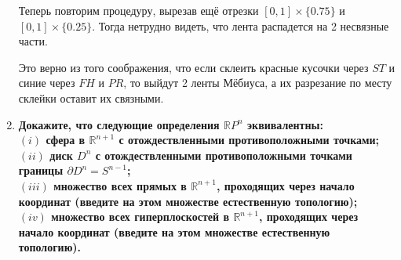 \documentclass{article}
\begin{document}
\begin{enumerate}
        Теперь повторим процедуру, вырезав ещё отрезки $[0,1]\times\{0.75\}$ и
        $[0,1]\times\{0.25\}$. Тогда нетрудно видеть, что лента распадется на
        2 несвязные части.

        \begin{center}
        \end{center}

        Это верно из того соображения, что если склеить красные кусочки через
        $ST$ и синие через $FH$ и $PR$, то выйдут 2 ленты Мёбиуса, а их
        разрезание по месту склейки оставит их связными.

    \item
        \textbf{Докажите, что следующие определения $\mathbb{R}P^n$ эквивалентны:\vspace{1ex}\\
                $(i)$ сфера в $\mathbb{R}^{n+1}$ с отождествленными
                противоположными точками;\vspace{1ex}\\
                $(ii)$ диск $D^n$ с отождествленными противоположными
                точками границы $\partial D^n = S^{n−1}$;\vspace{1ex}\\
                $(iii)$ множество всех прямых в $\mathbb{R}^{n+1}$, проходящих
                через начало координат (введите на этом множестве естественную
                топологию);\vspace{1ex}\\
                $(iv)$ множество всех гиперплоскостей в $\mathbb{R}^{n+1}$,
                проходящих через начало координат (введите на этом множестве
                естественную топологию).}
                

\end{enumerate}
\end{document}
